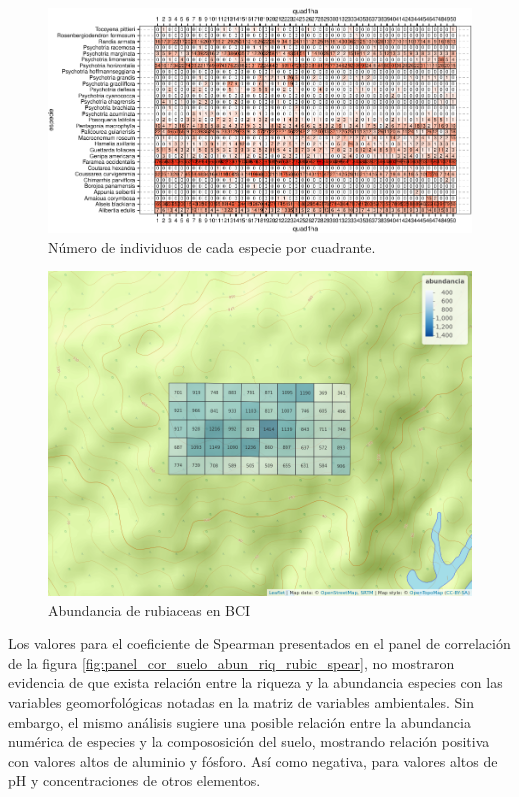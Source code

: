 \documentclass[11pt,]{article}
\begin{document}
\begin{figure}
\centering
\includegraphics{manuscrito_files/figure-latex/unnamed-chunk-2-1.pdf}
\caption{\label{fig:abun_sp_q}Número de individuos de cada especie por
cuadrante.}
\end{figure}

\begin{figure}
\centering
\includegraphics{mapa_cuadros_abun_rubic.png}
\caption{Abundancia de rubiaceas en BCI
\label{fig:mapa_cuadros_abun_rubic}}
\end{figure}

Los valores para el coeficiente de Spearman presentados en el panel de
correlación de la figura \ref{fig:panel_cor_suelo_abun_riq_rubic_spear},
no mostraron evidencia de que exista relación entre la riqueza y la
abundancia especies con las variables geomorfológicas notadas en la
matriz de variables ambientales. Sin embargo, el mismo análisis sugiere
una posible relación entre la abundancia numérica de especies y la
compososición del suelo, mostrando relación positiva con valores altos
de aluminio y fósforo. Así como negativa, para valores altos de pH y
concentraciones de otros elementos.
\end{document}
